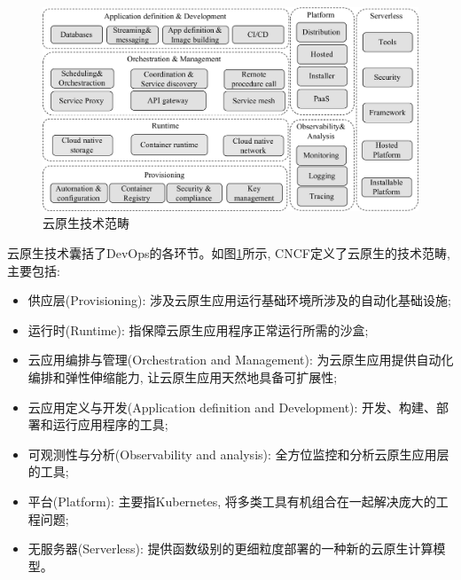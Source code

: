 \begin{figure}[h] %
    \centering %
    \includegraphics[width=1.0 \textwidth]{FIGs/chapter2/cloud_native_landscape.pdf} %
    \caption{云原生技术范畴} %
    \label{cloud_native_landscape} %
\end{figure}%

云原生技术囊括了DevOps的各环节。如图\ref{cloud_native_landscape}所示, CNCF定义了云原生的技术范畴, 主要包括: 

\begin{itemize}[itemindent=2em]
    \item 供应层(Provisioning): 涉及云原生应用运行基础环境所涉及的自动化基础设施;

    \item 运行时(Runtime): 指保障云原生应用程序正常运行所需的沙盒;

    \item 云应用编排与管理(Orchestration and Management): 为云原生应用提供自动化编排和弹性伸缩能力, 让云原生应用天然地具备可扩展性;

    \item 云应用定义与开发(Application definition and Development): 开发、构建、部署和运行应用程序的工具;

    \item 可观测性与分析(Observability and analysis): 全方位监控和分析云原生应用层的工具;

    \item 平台(Platform): 主要指Kubernetes, 将多类工具有机组合在一起解决庞大的工程问题;

    \item 无服务器(Serverless): 提供函数级别的更细粒度部署的一种新的云原生计算模型。
\end{itemize}


